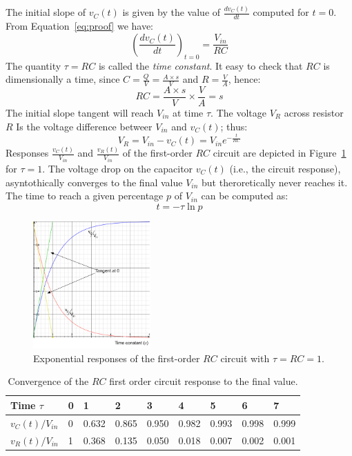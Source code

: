 The initial slope of $v_C(t)$ is given by the value of $\frac{dv_C(t)}{dt}$ computed for $t=0$. From Equation~\ref{eq:proof} we have:
\begin{equation}
\left(\frac{dv_C(t)}{dt}\right)_{t=0} = \frac{V_{in}}{RC}
\end{equation}
The quantity $\tau = RC$ is called the \emph{time constant}. It easy to check that $RC$ is dimensionally a time, since $C = \frac{Q}{V}=\frac{A\times s}{V}$ and $R =\frac{V}{A}$, hence:
\[RC = \frac{A\times s}{V} \times \frac{V}{A} = s\]
The initial slope tangent will reach $V_{in}$ at time $\tau$. The voltage $V_R$ across resistor $R$ Is the voltage difference betweer $V_{in}$ and $v_C(t)$; thus:
\begin{equation}
V_R = V_{in} - v_C(t) = V_{in}e^{-\frac{t}{RC}}
\end{equation}
Responses $\frac{v_C(t)}{V_{in}}$ and $\frac{v_R(t)}{V_{in}}$ of the first-order $RC$ circuit are depicted in Figure~\ref{Fig:RC_time_constant} for $\tau=1$. The voltage drop on the capacitor $v_C(t)$ (i.e., the circuit response), asyntothically converges to the final value $V_{in}$ but theroretically never reaches it. The time to reach a given percentage $p$ of $V_{in}$ can be computed as:
\begin{equation}
 t= -\tau\ln p
\end{equation} 
\begin{figure}[h!]
  \centering  \includegraphics[width=0.4\textwidth]{"images/RC_time_constant"}
  \caption{Exponential responses of the first-order $RC$ circuit with $\tau=RC=1$.} 
  \label{Fig:RC_time_constant}
\end{figure}

\begin{table}
  \centering
  \begin{tabular}{ l  l  l  l  l  l  l  l  l }
  Time $\tau$ & 0 & 1 & 2 & 3 & 4 & 5 & 6 & 7 \\\hline
  $v_C(t)/V_{in}$ & 0 & 0.632 & 0.865 & 0.950 & 0.982 & 0.993 & 0.998 & 0.999 \\
  $v_R(t)/V_{in}$ & 1 & 0.368 & 0.135 & 0.050 & 0.018 & 0.007 & 0.002 & 0.001 \\
  \end{tabular}
\caption{Convergence of the $RC$ first order circuit response to the final value.}
\label{Tab:RC_responses}
\end{table}


